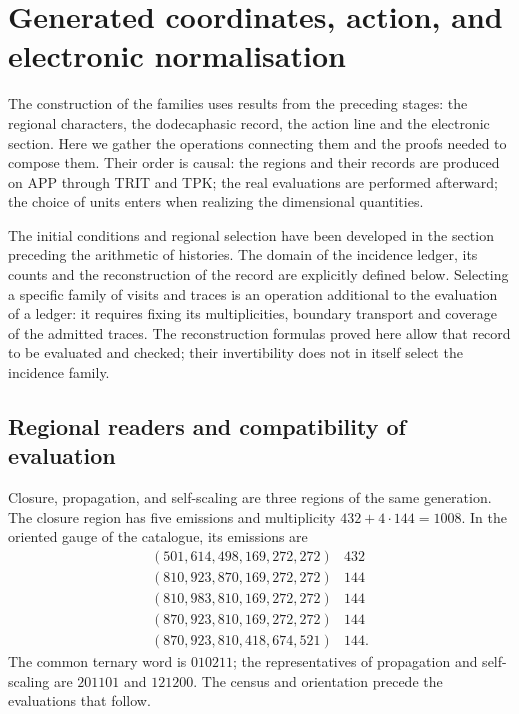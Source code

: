 \section{Generated coordinates, action, and electronic normalisation}
\label{vi:vi:dep:seccion}\label{vi:sec:k-registro}

The construction of the families uses results from the preceding stages:
the regional characters, the dodecaphasic record, the action line and the
electronic section. Here we gather the operations connecting them and the
proofs needed to compose them. Their order is causal: the regions and their
records are produced on APP through TRIT and TPK; the real evaluations
are performed afterward; the choice of units enters when realizing the
dimensional quantities.

The initial conditions and regional selection have been developed in
the section preceding the arithmetic of histories. The domain of the incidence
ledger, its counts and the reconstruction of the record are explicitly
defined below. Selecting a specific family of
visits and traces is an operation additional to the evaluation of a ledger:
it requires fixing its multiplicities, boundary transport and
coverage of the admitted traces. The reconstruction formulas proved
here allow that record to be evaluated and checked; their
invertibility does not in itself select the incidence family.

\subsection{Regional readers and compatibility of evaluation}
\label{vi:vi:dep:regiones}

Closure, propagation, and self-scaling are three regions of the same
generation. The closure region has five emissions and multiplicity
\(432+4\cdot144=1008\). In the oriented gauge of the catalogue, its emissions
are
\[
\begin{array}{c|r}
(501,614,498,169,272,272)&432\\
(810,923,870,169,272,272)&144\\
(810,983,810,169,272,272)&144\\
(870,923,810,169,272,272)&144\\
(870,923,810,418,674,521)&144.
\end{array}
\]
The common ternary word is \(010211\); the representatives of propagation
and self-scaling are \(201101\) and \(121200\). The census and orientation
precede the evaluations that follow.

